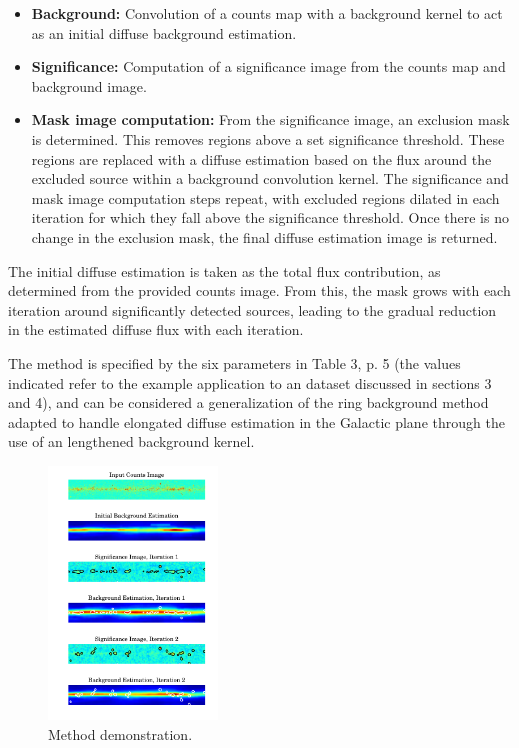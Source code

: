 \documentclass{PoS}
\begin{document}
\begin{itemize}[noitemsep,nolistsep]
\item \textbf{Background:} Convolution of a counts map with a background kernel to act as an initial diffuse background estimation.
\item \textbf{Significance:} Computation of a significance image from the counts map and background image.
\item \textbf{Mask image computation:} From the significance image, an exclusion mask is determined. This removes regions above a set significance threshold. These regions are replaced with a diffuse estimation based on the flux around the excluded source within a background convolution kernel. The significance and mask image computation steps repeat, with excluded regions dilated in each iteration for which they fall above the significance threshold. Once there is no change in the exclusion mask, the final diffuse estimation image is returned.
\end{itemize}

The initial diffuse estimation is taken as the total flux contribution, as determined from the provided counts image. From this, the mask grows with each iteration around significantly detected sources, leading to the gradual reduction in the estimated diffuse flux with each iteration.

The method is specified by the six parameters in Table 3, p. 5 (the values indicated refer to the example application to an dataset discussed in sections 3 and 4), and can be considered a generalization of the ring background method \cite{berge} adapted to handle elongated diffuse estimation in the Galactic plane through the use of an lengthened background kernel.

\begin{figure}
\vspace{-10pt}
      \includegraphics[width=0.4\textwidth]{figures/iterations.pdf}
  \caption{Method demonstration.}
\vspace{-30pt}
\end{figure}
\end{document}
